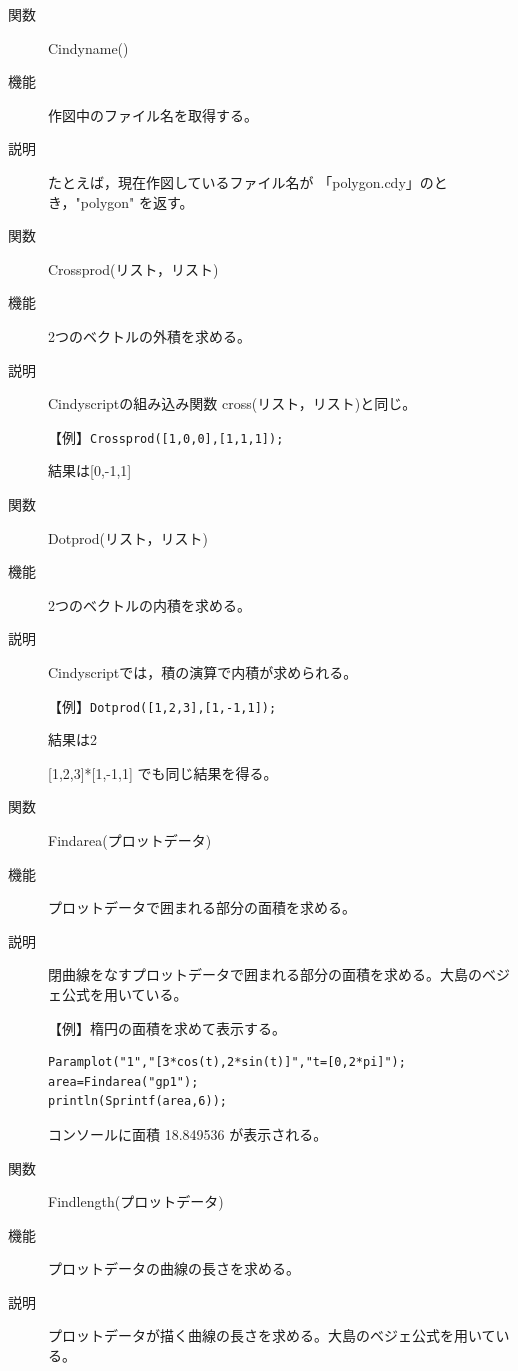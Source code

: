 \documentclass[papersize,a4paper,10pt,uplatex]{jsarticle}
\begin{document}
\begin{description}
\vspace{\baselineskip}
\hypertarget{cindyname}{}
\item[関数]Cindyname()
\item[機能]作図中のファイル名を取得する。
\item[説明]たとえば，現在作図しているファイル名が 「polygon.cdy」のとき，"polygon" を返す。

\vspace{\baselineskip}
\hypertarget{crossprod}{}
\item[関数]Crossprod(リスト，リスト)
\item[機能]2つのベクトルの外積を求める。
\item[説明]Cindyscriptの組み込み関数 cross(リスト，リスト)と同じ。

\vspace{\baselineskip}
【例】\verb|Crossprod([1,0,0],[1,1,1]);|

結果は[0,-1,1]\\

\vspace{\baselineskip}
\hypertarget{dotprod}{}
\item[関数]Dotprod(リスト，リスト)
\item[機能]2つのベクトルの内積を求める。
\item[説明]Cindyscriptでは，積の演算で内積が求められる。

\vspace{\baselineskip}
【例】\verb|Dotprod([1,2,3],[1,-1,1]);|

結果は2

[1,2,3]*[1,-1,1] でも同じ結果を得る。

\vspace{\baselineskip}
\hypertarget{findarea}{}
\item[関数]Findarea(プロットデータ)
\item[機能]プロットデータで囲まれる部分の面積を求める。
\item[説明]閉曲線をなすプロットデータで囲まれる部分の面積を求める。大島のベジェ公式を用いている。

\vspace{\baselineskip}
【例】楕円の面積を求めて表示する。
\begin{verbatim}
Paramplot("1","[3*cos(t),2*sin(t)]","t=[0,2*pi]");
area=Findarea("gp1");
println(Sprintf(area,6));
\end{verbatim}

コンソールに面積 18.849536 が表示される。 

\vspace{\baselineskip}
\hypertarget{findlength}{}
\item[関数]Findlength(プロットデータ)
\item[機能]プロットデータの曲線の長さを求める。
\item[説明]プロットデータが描く曲線の長さを求める。大島のベジェ公式を用いている。


\end{description}
\end{document}
